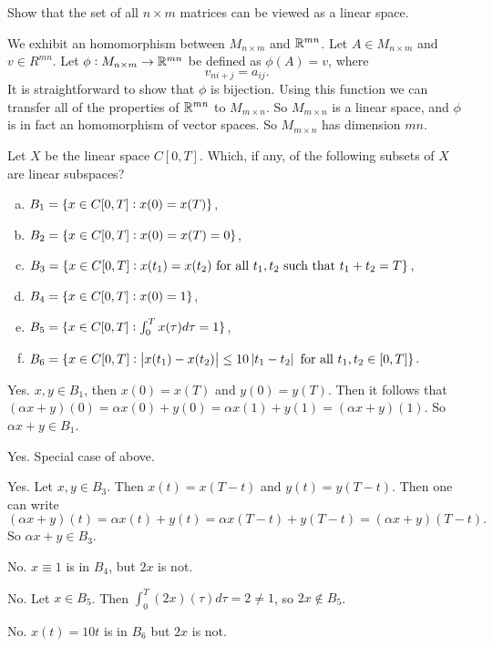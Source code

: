 \begin{problem}
	Show that the set of all $ n\times m $ matrices can be viewed as a linear space.
\end{problem}
\begin{solution}
	We exhibit an homomorphism between $ M_{n\times m} $ and $ \mathbb{R}^{mn} $. Let $ A \in M_{n\times m} $ and $ v \in R^{mn} $. Let $ \phi: M_{n\times m} \to \mathbb{R}^{mn} $ be defined as $ \phi(A) = v $, where
	\[ v_{ni+j} = a_{ij}. \]
	It is straightforward to show that $ \phi $ is bijection. Using this function we can transfer all of the properties of  $ \mathbb{R}^{mn} $ to $ M_{m\times n} $. So $ M_{m\times n} $ is a linear space, and $ \phi $ is in fact an homomorphism of vector spaces. So $ M_{m\times n} $ has dimension $ mn $.
\end{solution}



\begin{problem}
	Let $ X $ be the linear space $ C[0,T] $. Which, if any, of the following subsets of $ X $ are linear subspaces?
	\begin{enumerate}[(a)]
		\item $ B_1 = \{x\in C[0,T]: x(0) = x(T)\} $,
		\item $ B_2 = \{x\in C[0,T]: x(0) = x(T) = 0\} $,
		\item $ B_3 = \{x\in C[0,T]: x(t_1)=x(t_2) \text{ for all $ t_1,t_2 $ such that $ t_1+t_2 = T $}\} $,
		\item $ B_4 = \{x\in C[0,T]: x(0) = 1\} $,
		\item $ B_5 = \{x\in C[0,T]: \int_{0}^{T} x(\tau) d\tau = 1 \} $,
		\item $ B_6 = \{x\in C[0,T]: \left|x(t_1)-x(t_2)\right|\leq 10\left|t_1-t_2\right| \text{ for all $ t_1,t_2\in [0,T] $}\} $.
	\end{enumerate}
\end{problem}

\begin{solution}
	\item Yes. $ x,y\in B_1 $, then $ x(0) = x(T) $ and $ y(0) = y(T) $. Then it follows that $ (\alpha x+y)(0) = \alpha x(0) + y(0) = \alpha x(1) + y(1) = (\alpha x + y)(1) $. So $ \alpha x + y \in B_1 $.
	
	\item Yes. Special case of above.
	
	\item Yes. Let $ x,y\in B_3 $. Then $ x(t) = x(T-t) $ and $ y(t) = y(T-t) $. Then one can write
	\[ (\alpha x + y)(t) = \alpha x(t) + y(t) = \alpha x(T-t) + y(T-t) = (\alpha x+y)(T-t). \]
	So $ \alpha x + y \in B_3 $.
	
	\item No. $ x\equiv 1 $ is in $ B_4 $, but $ 2x $ is not.
	
	\item No. Let $ x\in B_5 $. Then $ \int_{0}^{T} (2x)(\tau) d\tau = 2 \neq 1$, so $ 2x \notin B_5 $.
	
	\item No.  $ x(t) = 10t $ is in $ B_6 $ but $ 2x $ is not.
\end{solution}


